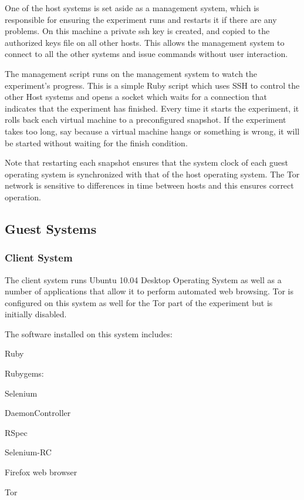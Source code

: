 One of the host systems is set aside as a management system, which is responsible for ensuring the experiment runs and restarts it if there are any problems. On this machine a private ssh key is created, and copied to the authorized keys file on all other hosts. This allows the management system to connect to all the other systems and issue commands without user interaction.

The management script runs on the management system to watch the experiment's progress. This is a simple Ruby script which uses SSH to control the other Host systems and opens a socket which waits for a connection that indicates that the experiment has finished. Every time it starts the experiment, it rolls back each virtual machine to a preconfigured snapshot. If the experiment takes too long, say because a virtual machine hangs or something is wrong, it will be started without waiting for the finish condition.

Note that restarting each snapshot ensures that the system clock of each guest operating system is synchronized with that of the host operating system. The Tor network is sensitive to differences in time between hosts and this ensures correct operation.

\subsection{Guest Systems}

\subsubsection{Client System}

The client system runs Ubuntu 10.04 Desktop Operating System as well as a number of applications that allow it to perform automated web browsing. Tor is configured on this system as well for the Tor part of the experiment but is initially disabled.

The software installed on this system includes:

\begin{itemize*}
  \item Ruby
  \item Rubygems:
    \begin{itemize*}
      \item Selenium
      \item DaemonController
      \item RSpec
    \end{itemize*}
  \item Selenium-RC
  \item Firefox web browser
  \item Tor
\end{itemize*}

